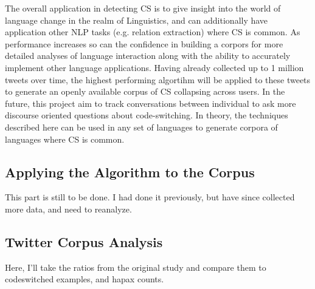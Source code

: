 \documentclass[12pt]{article}\usepackage[]{graphicx}\usepackage[]{color}
\begin{document}
The overall application in detecting CS is to give insight into the world of language change in the realm of Linguistics, and can additionally have application other NLP tasks (e.g. relation extraction) where CS is common. As performance increases so can the confidence in building a corpors for more detailed analyses of language interaction along with the ability to accurately implement other language applications. Having already collected up to 1 million tweets over time, the highest performing algortihm will be applied to these tweets to generate an openly available corpus of CS collapsing across users. In the future, this project aim to track conversations between individual to ask more discourse oriented questions about code-switching. In theory, the techniques described here can be used in any set of languages to generate corpora of languages where CS is common.

\subsection{Applying the Algorithm to the Corpus}

This part is still to be done. I had done it previously, but have since collected more data, and need to reanalyze.

\subsection{Twitter Corpus Analysis}

Here, I'll take the ratios from the original study and compare them to codeswitched examples, and hapax counts.



\par\bigskip

\end{document}
